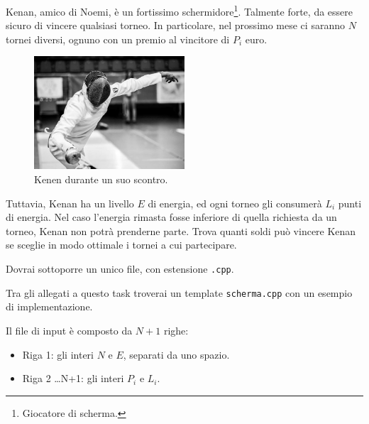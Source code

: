 \usepackage{xcolor}
\usepackage{afterpage}
\usepackage{pifont,mdframed}
\usepackage[bottom]{footmisc}
\usepackage{minted}


\newcommand{\inputfile}{\texttt{stdin}}
\newcommand{\outputfile}{\texttt{stdout}}
\makeatletter
\renewcommand{\this@inputfilename}{\texttt{stdin}}
\renewcommand{\this@outputfilename}{\texttt{stdout}}
\makeatother


Kenan, amico di Noemi, è un fortissimo schermidore\footnote{Giocatore di scherma.}. Talmente forte, da
essere sicuro di vincere qualsiasi torneo.
In particolare, nel prossimo mese ci saranno $N$ tornei diversi, ognuno con un premio al vincitore di $P_i$ euro.

\begin{figure}[h]
    \centering
    \includegraphics[width=0.5\textwidth]{kenen.jpg}
    \caption{Kenen durante un suo scontro.}
\end{figure}
Tuttavia, Kenan ha un livello $E$ di energia, ed ogni torneo gli consumerà $L_i$ punti di energia. Nel caso l'energia rimasta fosse
inferiore di quella richiesta da un torneo, Kenan non potrà prenderne parte.
Trova quanti soldi può vincere Kenan se sceglie in modo ottimale i tornei a cui partecipare.





\Implementation

Dovrai sottoporre un unico file, con estensione \texttt{.cpp}.

\begin{warning}
    Tra gli allegati a questo task troverai un template \texttt{scherma.cpp} con un esempio di implementazione.
\end{warning}

Il file di input è composto da $N+1$ righe:
\begin{itemize}
    \item Riga 1: gli interi $N$ e $E$, separati da uno spazio.
    \item Riga 2 \dots N+1: gli interi $P_i$ e $L_i$.
\end{itemize}

